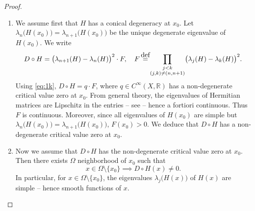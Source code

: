 \documentclass[11pt]{article}
\newcommand{\skpt}{\smallskip}
\numberwithin{equation}{section}
\theoremstyle{definition}
\newcommand{\R}{\mathbb{R}}
\newcommand{\de}{\,\mathrel{\stackrel{\makebox[0pt]{\mbox{\normalfont\tiny def}}}{=}}}
\begin{document}
\pagebreak[2]
\skpt
\begin{proof}
\begin{enumerate}
\item
We assume first that $H$ has a conical degeneracy at $x_0$. Let $\lambda_n\bigl( H(x_0) \bigr) = \lambda_{n+1}\bigl( H(x_0) \bigr)$ be the unique degenerate eigenvalue of $H(x_0)$. We write\vspace*{-3pt}
\begin{equation*}
D \circ H = \bigl( \lambda_{n+1}(H) - \lambda_n(H)\bigr)^2 \cdot F, \quad F \de \prod_{\substack{j < k \\ (j,k) \neq (n,n+1)}} \bigl(\lambda_j(H)-\lambda_k(H)\bigr)^2.
\end{equation*}
Using \eqref{eq:1k}, $D \circ H = q \cdot F$, where $q \in C^\infty(X,\R)$ has a non-degenerate critical value zero at $x_0$. From general theory, the eigenvalues of Hermitian matrices are Lipschitz in the entries -- see \cite[Prop.\,6.2]{S10} -- hence a fortiori continuous. Thus $F$ is continuous. Moreover, since all eigenvalues of $H(x_0)$ are simple but $\lambda_n\bigl( H(x_0) \bigr) = \lambda_{n+1}\bigl( H(x_0) \bigr)$, $F(x_0) > 0$. We deduce that $D \circ H$ has a non-degenerate critical value zero at $x_0$.

\item
Now we assume that $D \circ H$ has the non-degenerate critical value zero at $x_0$. Then there exists $\Omega$ neighborhood of $x_0$ such that\vspace*{-3pt}
\begin{equation*}
x \in \Omega \setminus \{ x_0\} \implies D \circ H(x) \neq 0.
\end{equation*}
In particular, for $x \in \Omega \setminus \{ x_0\}$, the eigenvalues $\lambda_j\bigl(H(x)\bigr)$ of $H(x)$ are simple -- hence smooth functions of $x$.


\end{enumerate}
\end{proof}
\end{document}
